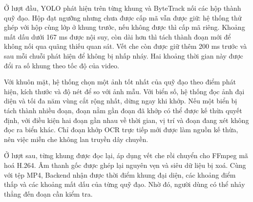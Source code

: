 Ở lượt đầu, YOLO phát hiện trên từng khung và ByteTrack nối các hộp thành quỹ đạo. Hộp đạt ngưỡng nhưng chưa được cấp mã vẫn được giữ: hệ thống thử ghép với hộp cùng lớp ở khung trước, nếu không được thì cấp mã riêng. Khoảng mất dấu dưới 167 ms được nội suy, còn dài hơn thì tách thành đoạn mới để không nối qua quãng thiếu quan sát. Vết che còn được giữ thêm 200 ms trước và sau mỗi chuỗi phát hiện để không bị nhấp nháy. Hai khoảng thời gian này được đổi ra số khung theo tốc độ của video.

Với khuôn mặt, hệ thống chọn một ảnh tốt nhất của quỹ đạo theo điểm phát hiện, kích thước và độ nét để so với ảnh mẫu. Với biển số, hệ thống đọc ảnh đại diện và tối đa năm vùng cắt rộng nhất, dừng ngay khi khớp. Nếu một biển bị tách thành nhiều đoạn, đoạn nằm gần đoạn đã khớp có thể được kế thừa quyết định, với điều kiện hai đoạn gần nhau về thời gian, vị trí và đoạn đang xét không đọc ra biển khác. Chỉ đoạn khớp OCR trực tiếp mới được làm nguồn kế thừa, nên việc miễn che không lan truyền dây chuyền.

Ở lượt sau, từng khung được đọc lại, áp dụng vết che rồi chuyển cho FFmpeg mã hoá H.264. Âm thanh gốc được ghép lại nguyên vẹn và siêu dữ liệu bị xoá. Cùng với tệp MP4, Backend nhận được thời điểm khung đại diện, các khoảng điểm thấp và các khoảng mất dấu của từng quỹ đạo. Nhờ đó, người dùng có thể nhảy thẳng đến đoạn cần kiểm tra.
